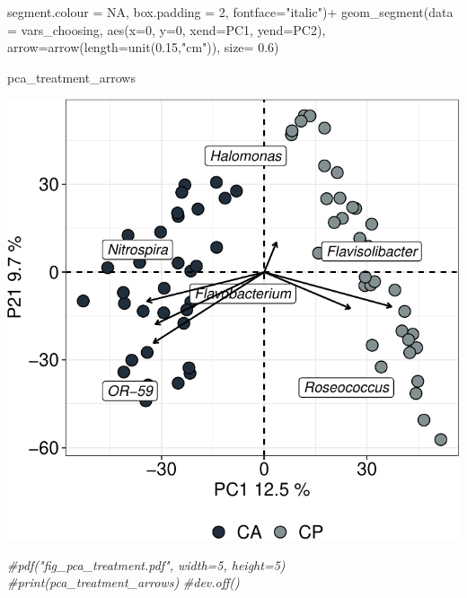 \documentclass[]{interact}
\theoremstyle{plain}%
\theoremstyle{definition}
\theoremstyle{remark}
\newenvironment{Shaded}{\begin{snugshade}}{\end{snugshade}}
\newcommand{\AttributeTok}[1]{\textcolor[rgb]{0.77,0.63,0.00}{#1}}
\newcommand{\CommentTok}[1]{\textcolor[rgb]{0.56,0.35,0.01}{\textit{#1}}}
\newcommand{\ConstantTok}[1]{\textcolor[rgb]{0.00,0.00,0.00}{#1}}
\newcommand{\DecValTok}[1]{\textcolor[rgb]{0.00,0.00,0.81}{#1}}
\newcommand{\FloatTok}[1]{\textcolor[rgb]{0.00,0.00,0.81}{#1}}
\newcommand{\FunctionTok}[1]{\textcolor[rgb]{0.00,0.00,0.00}{#1}}
\newcommand{\NormalTok}[1]{#1}
\newcommand{\SpecialCharTok}[1]{\textcolor[rgb]{0.00,0.00,0.00}{#1}}
\newcommand{\StringTok}[1]{\textcolor[rgb]{0.31,0.60,0.02}{#1}}
\begin{document}
\begin{Shaded}
\begin{Highlighting}[]
                            \AttributeTok{segment.colour =} \ConstantTok{NA}\NormalTok{, }\AttributeTok{box.padding =} \DecValTok{2}\NormalTok{, }\AttributeTok{fontface=}\StringTok{"italic"}\NormalTok{)}\SpecialCharTok{+}
  \FunctionTok{geom\_segment}\NormalTok{(}\AttributeTok{data =}\NormalTok{ vars\_choosing, }\FunctionTok{aes}\NormalTok{(}\AttributeTok{x=}\DecValTok{0}\NormalTok{, }\AttributeTok{y=}\DecValTok{0}\NormalTok{, }\AttributeTok{xend=}\NormalTok{PC1, }\AttributeTok{yend=}\NormalTok{PC2), }
               \AttributeTok{arrow=}\FunctionTok{arrow}\NormalTok{(}\AttributeTok{length=}\FunctionTok{unit}\NormalTok{(}\FloatTok{0.15}\NormalTok{,}\StringTok{"cm"}\NormalTok{)),}
               \AttributeTok{size=} \FloatTok{0.6}\NormalTok{)}

\NormalTok{pca\_treatment\_arrows}
\end{Highlighting}
\end{Shaded}

\begin{center}\includegraphics{Doc_pdf_files/figure-latex/unnamed-chunk-29-1} \end{center}

\begin{Shaded}
\begin{Highlighting}[]
\CommentTok{\#pdf("fig\_pca\_treatment.pdf", width=5, height=5)}
\CommentTok{\#print(pca\_treatment\_arrows)}
\CommentTok{\#dev.off()}
\end{Highlighting}
\end{Shaded}
\end{document}

